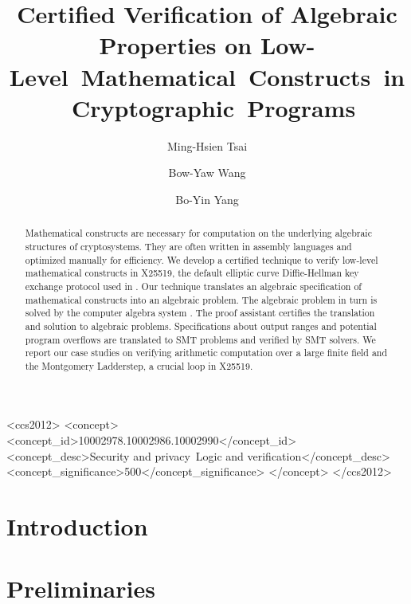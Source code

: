 \documentclass[sigconf, anonymous]{acmart}
\title{Certified Verification of Algebraic Properties on
Low- \mbox{Level Mathematical Constructs in Cryptographic Programs}}
\author{Ming-Hsien Tsai}
\affiliation{
  \institution{Academia Sinica}
  \streetaddress{Taipei, Taiwan}
}
\author{Bow-Yaw Wang}
\affiliation{
  \institution{Academia Sinica}
  \streetaddress{Taipei, Taiwan}
}
\author{Bo-Yin Yang}
\affiliation{
  \institution{Academia Sinica}
  \streetaddress{Taipei, Taiwan}
}
\author{\vspace*{-1.2cm}}
\affiliation{\vspace*{-1.2cm}\ }
\begin{document}

\begin{abstract}
  Mathematical constructs are necessary for computation on the
  underlying algebraic structures of cryptosystems. They are often
  written in assembly languages and optimized manually for
  efficiency. We develop a certified technique to verify low-level mathematical
  constructs in X25519, the default elliptic curve Diffie-Hellman key
  exchange protocol used in \openssh. Our technique translates an
  algebraic specification of mathematical constructs into an algebraic
  problem. The algebraic
  problem in turn is solved by the computer algebra system \singular.
  The proof assistant
  \coq certifies the translation and solution to algebraic
  problems.
  Specifications about output ranges and potential program overflows are translated to SMT problems and verified by SMT solvers.
  We report our case studies on verifying
  arithmetic computation over a large finite field and
  the Montgomery Ladderstep, a crucial loop in X25519.
\end{abstract}

\begin{CCSXML}
<ccs2012>
<concept>
<concept_id>10002978.10002986.10002990</concept_id>
<concept_desc>Security and privacy~Logic and verification</concept_desc>
<concept_significance>500</concept_significance>
</concept>
</ccs2012>
\end{CCSXML}



\maketitle

\section{Introduction}
\label{section:introduction}



\section{Preliminaries}
\label{section:preliminaries}

\end{document}
